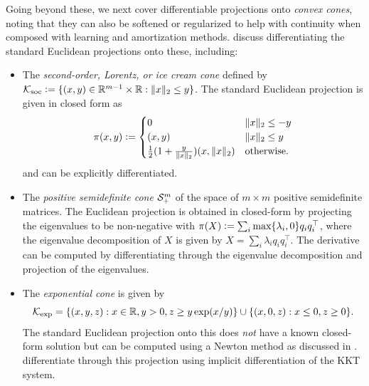 \documentclass[twoside,11pt]{article}
\begin{document}
Going beyond these, we next cover differentiable projections onto
\emph{convex cones}, noting that they can also be softened or regularized
to help with continuity when composed with learning and
amortization methods.
\citet{ali2017semismooth,busseti2019solution} discuss
differentiating the standard Euclidean projections
onto these, including:
\begin{itemize}
\item
  \begin{minipage}[t]{0.65\textwidth}
  The \emph{second-order, Lorentz, or ice cream cone}
  defined by
  ${\mathcal{K}}_{\rm soc}\vcentcolon=\{(x,y)\in\mathbb{R}^{m-1}\times\mathbb{R} : \|x\|_2\leq y\}$.
  The standard Euclidean projection is given in closed form as
  \begin{equation}
    \pi(x, y) \vcentcolon=
    \begin{cases}
      0 & \|x\|_2 \leq -y \\
      (x,y) & \|x\|_2 \leq y \\
      \frac{1}{2} (1 + \frac{y}{\|x\|_2}) (x, \|x\|_2) & \textrm{otherwise}.
    \end{cases}
  \end{equation}
  and can be explicitly differentiated.
  \end{minipage}
  \hspace{8mm}
  \begin{minipage}[t]{0.2\textwidth}
  \vspace{-2mm}
  \end{minipage}
\item The \emph{positive semidefinite cone} ${\mathcal{S}}^m_+$ of the
  space of $m\times m$ positive semidefinite matrices.
  The Euclidean projection is obtained in closed-form
  by projecting the eigenvalues to be non-negative with
  $\pi(X)\vcentcolon=\sum_i\max\{\lambda_i, 0\}q_iq_i^\top$,
  where the eigenvalue decomposition of $X$ is given by
  $X=\sum_i\lambda_iq_iq_i^\top$.
  The derivative can be computed by differentiating
  through the eigenvalue decomposition and projection
  of the eigenvalues.
\item The \emph{exponential cone} is given by
  \begin{equation}
  {\mathcal{K}}_{\rm exp}=\{(x,y,z) : x\in\mathbb{R}, y>0, z\geq y\exp(x/y)\}\cup
  \{(x,0,z): x\leq0, z\geq 0\}.
  \label{eq:exp-cone}
  \end{equation}
  The standard Euclidean projection onto this does
  \emph{not} have a known closed-form solution
  but can be computed using a Newton method
  as discussed in
  \citep[\S6.3.4]{parikh2014proximal}.
  \citet{ali2017semismooth} differentiate through
  this projection using implicit differentiation
  of the KKT system.
\end{itemize}
\end{document}

